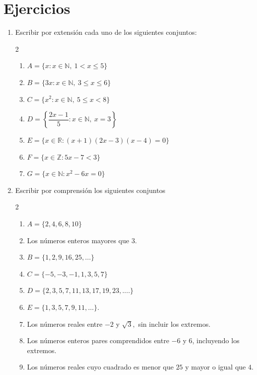 \documentclass[12pt]{article}
\begin{document}
\section{Ejercicios}
\begin{enumerate}
    \item Escribir por extensión cada uno de los siguientes conjuntos:
    \begin{multicols}{2}
        \begin{enumerate}
    \item $
A = \{x : x \in \mathbb{N},\ 1 < x \le 5\}
$
\item $
B = \{3x : x \in \mathbb{N},\ 3 \le x \le 6\}
$
\item $
C = \{x^{2} : x \in \mathbb{N},\ 5 \le x < 8\}
$
\item $
D = \left\{ \dfrac{2x - 1}{5} :x \in \mathbb{N},\ x = 3 \right\}
$
\item $E= \{x\in \mathbb{R}: (x+1)(2x-3)(x-4)=0\}$
\item $F=\{x\in \mathbb{Z}: 5x-7<3\}$
\item $G=\{x\in \mathbb{N}: x^2-6x=0\}$
\end{enumerate}
    \end{multicols}


\item Escribir por comprensión los siguientes conjuntos
\begin{multicols}{2}
    \begin{enumerate}
    \item $A = \{2,4,6,8,10\}$
    \item Los números enteros mayores que $3$.
    \item $B=\{1, 2, 9,  16, 25, ...\}$
    \item $C=\{-5, -3, -1 , 1, 3, 5, 7\}$
    \item $D=\{2, 3, 5, 7, 11, 13, 17, 19, 23, ....\}$
    \item $E=\{1,3,5,7,9,11,\ldots\}$.
    \item Los números reales entre $-2$ y $\sqrt{3},$ sin incluir los extremos.
    \item Los números enteros pares comprendidos entre $-6$ y $6$, incluyendo los extremos.
    \item Los números reales cuyo cuadrado es menor que $25$ y mayor o igual que $4$.
\end{enumerate}
\end{multicols}



\end{enumerate}
\end{document}
